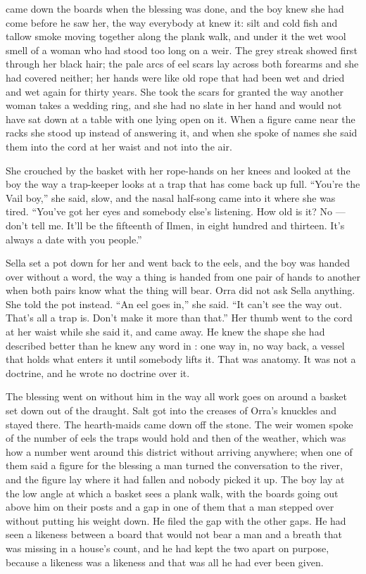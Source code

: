  came down the boards when the blessing was done, and the boy knew she had come before he saw her, the way everybody at  knew it: silt and cold fish and tallow smoke moving together along the plank walk, and under it the wet wool smell of a woman who had stood too long on a weir. The grey streak showed first through her black hair; the pale arcs of eel scars lay across both forearms and she had covered neither; her hands were like old rope that had been wet and dried and wet again for thirty years. She took the scars for granted the way another woman takes a wedding ring, and she had no slate in her hand and would not have sat down at a table with one lying open on it. When a figure came near the racks she stood up instead of answering it, and when she spoke of names she said them into the cord at her waist and not into the air.

She crouched by the basket with her rope-hands on her knees and looked at the boy the way a trap-keeper looks at a trap that has come back up full. “You're the Vail boy,” she said, slow, and the nasal half-song came into it where she was tired. “You've got her eyes and somebody else's listening. How old is it? No --- don't tell me. It'll be the fifteenth of Ilmen, in eight hundred and thirteen. It's always a date with you people.”

Sella set a pot down for her and went back to the eels, and the boy was handed over without a word, the way a thing is handed from one pair of hands to another when both pairs know what the thing will bear. Orra did not ask Sella anything. She told the pot instead. “An eel goes in,” she said. “It can't see the way out. That's all a trap is. Don't make it more than that.” Her thumb went to the cord at her waist while she said it, and came away. He knew the shape she had described better than he knew any word in : one way in, no way back, a vessel that holds what enters it until somebody lifts it. That was anatomy. It was not a doctrine, and he wrote no doctrine over it.

The blessing went on without him in the way all work goes on around a basket set down out of the draught. Salt got into the creases of Orra's knuckles and stayed there. The hearth-maids came down off the stone. The weir women spoke of the number of eels the traps would hold and then of the weather, which was how a number went around this district without arriving anywhere; when one of them said a figure for the blessing a man turned the conversation to the river, and the figure lay where it had fallen and nobody picked it up. The boy lay at the low angle at which a basket sees a plank walk, with the boards going out above him on their posts and a gap in one of them that a man stepped over without putting his weight down. He filed the gap with the other gaps. He had seen a likeness between a board that would not bear a man and a breath that was missing in a house's count, and he had kept the two apart on purpose, because a likeness was a likeness and that was all he had ever been given.

